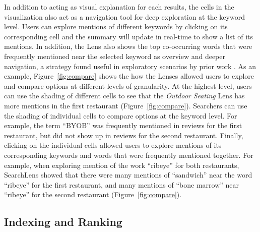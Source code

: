 \documentclass{sigchi}
\begin{document}
In addition to acting as visual explanation for each results, the cells in the visualization also act as a navigation tool for deep exploration at the keyword level. Users can explore mentions of different keywords by clicking on its corresponding cell and the summary will update in real-time to show a list of its mentions. In addition, the Lens also shows the top co-occurring words that were frequently mentioned near the selected keyword as overview and deeper navigation, a strategy found useful in exploratory scenarios by prior work \cite{di2018study,di2016rank,peltonen2017topic}. As an example, Figure~\ref{fig:compare} shows the how the Lenses allowed users to explore and compare options at different levels of granularity. At the highest level, users can use the shading of different cells to see that the \emph{Outdoor Seating} Lens has more mentions in the first restaurant (Figure~\ref{fig:compare}). Searchers can use the shading of individual cells to compare options at the keyword level. For example, the term ``BYOB'' was frequently mentioned in reviews for the first restaurant, but did not show up in reviews for the second restaurant. Finally, clicking on the individual cells allowed users to explore mentions of its corresponding keywords and words that were frequently mentioned together. For example, when exploring mention of the work ``ribeye'' for both restaurants, SearchLens showed that there were many mentions of ``sandwich'' near the word ``ribeye'' for the first restaurant, and many mentions of ``bone marrow'' near ``ribeye'' for the second restaurant (Figure~\ref{fig:compare}).



\subsection{Indexing and Ranking}
\end{document}

